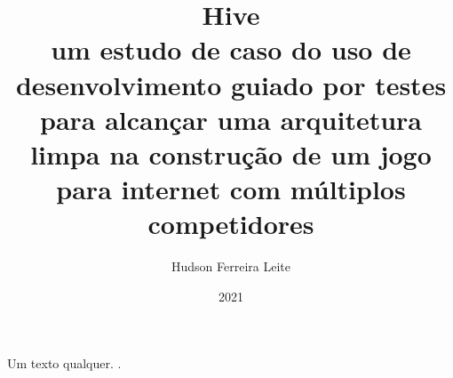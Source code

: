\documentclass[12pt,a4paper,oneside,english,brazil]{article}
\title{
  \textbf{Hive} \\
  \large um estudo de caso do uso de desenvolvimento guiado por testes para
  alcançar uma arquitetura limpa na construção de um jogo para internet com
  múltiplos competidores
}
\author{Hudson Ferreira Leite}
\date{2021}
\begin{document}
\maketitle

\clearpage
Um texto qualquer. \cite{freeman2009}.

\clearpage
\renewcommand\refname{Referências Bibliográficas}


\end{document}
